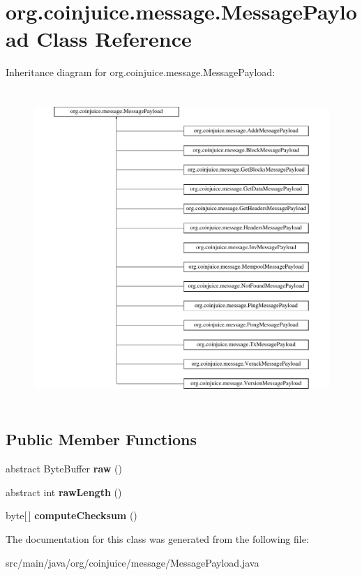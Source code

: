 \hypertarget{classorg_1_1coinjuice_1_1message_1_1_message_payload}{\section{org.\-coinjuice.\-message.\-Message\-Payload Class Reference}
\label{classorg_1_1coinjuice_1_1message_1_1_message_payload}
}
Inheritance diagram for org.\-coinjuice.\-message.\-Message\-Payload\-:\begin{figure}[H]
\begin{center}
\leavevmode
\includegraphics[height=12.000000cm]{classorg_1_1coinjuice_1_1message_1_1_message_payload}
\end{center}
\end{figure}
\subsection*{Public Member Functions}
\begin{DoxyCompactItemize}
\item 
\hypertarget{classorg_1_1coinjuice_1_1message_1_1_message_payload_aae6cccd031c3cd6958485fef89abefda}{abstract Byte\-Buffer {\bfseries raw} ()}\label{classorg_1_1coinjuice_1_1message_1_1_message_payload_aae6cccd031c3cd6958485fef89abefda}

\item 
\hypertarget{classorg_1_1coinjuice_1_1message_1_1_message_payload_af9a3e31d4d030af960d1745d21ca3d47}{abstract int {\bfseries raw\-Length} ()}\label{classorg_1_1coinjuice_1_1message_1_1_message_payload_af9a3e31d4d030af960d1745d21ca3d47}

\item 
\hypertarget{classorg_1_1coinjuice_1_1message_1_1_message_payload_a48e4e2b05a72d6dd789b362fb86a842b}{byte\mbox{[}$\,$\mbox{]} {\bfseries compute\-Checksum} ()}\label{classorg_1_1coinjuice_1_1message_1_1_message_payload_a48e4e2b05a72d6dd789b362fb86a842b}

\end{DoxyCompactItemize}


The documentation for this class was generated from the following file\-:\begin{DoxyCompactItemize}
\item 
src/main/java/org/coinjuice/message/Message\-Payload.\-java\end{DoxyCompactItemize}
